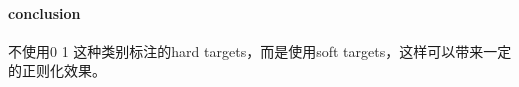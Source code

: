 \documentclass[11pt]{article} %
\begin{document}
\begin{CJK}{UTF8}{gkai}
\paragraph{conclusion}
不使用0 1 这种类别标注的hard targets，而是使用soft targets，这样可以带来一定的正则化效果。

\end{CJK}
\end{document}
